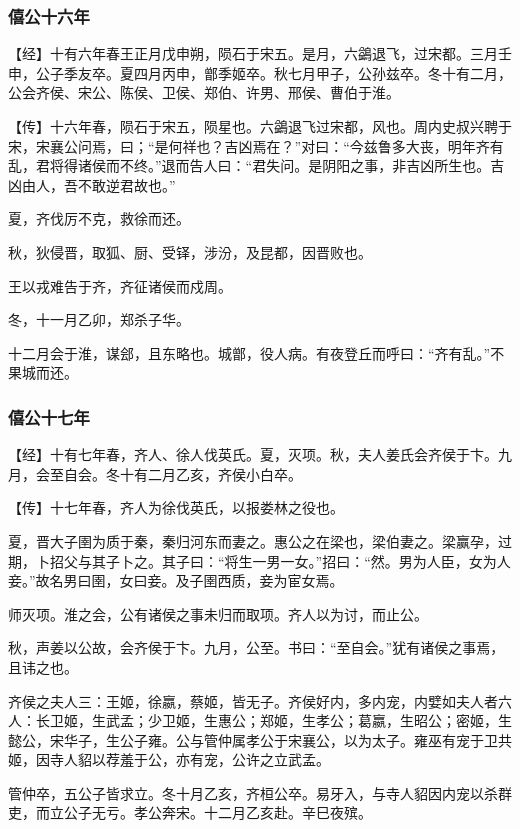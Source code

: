 \documentclass[]{article}
\begin{document}
\hypertarget{header-n818}{%
\subsubsection{僖公十六年}\label{header-n818}}

【经】十有六年春王正月戊申朔，陨石于宋五。是月，六鷁退飞，过宋都。三月壬申，公子季友卒。夏四月丙申，鄫季姬卒。秋七月甲子，公孙兹卒。冬十有二月，公会齐侯、宋公、陈侯、卫侯、郑伯、许男、邢侯、曹伯于淮。

【传】十六年春，陨石于宋五，陨星也。六鷁退飞过宋都，风也。周内史叔兴聘于宋，宋襄公问焉，曰；``是何祥也？吉凶焉在？''对曰：``今兹鲁多大丧，明年齐有乱，君将得诸侯而不终。''退而告人曰：``君失问。是阴阳之事，非吉凶所生也。吉凶由人，吾不敢逆君故也。''

夏，齐伐厉不克，救徐而还。

秋，狄侵晋，取狐、厨、受铎，涉汾，及昆都，因晋败也。

王以戎难告于齐，齐征诸侯而戍周。

冬，十一月乙卯，郑杀子华。

十二月会于淮，谋郐，且东略也。城鄫，役人病。有夜登丘而呼曰：``齐有乱。''不果城而还。

\hypertarget{header-n828}{%
\subsubsection{僖公十七年}\label{header-n828}}

【经】十有七年春，齐人、徐人伐英氏。夏，灭项。秋，夫人姜氏会齐侯于卞。九月，会至自会。冬十有二月乙亥，齐侯小白卒。

【传】十七年春，齐人为徐伐英氏，以报娄林之役也。

夏，晋大子圉为质于秦，秦归河东而妻之。惠公之在梁也，梁伯妻之。梁赢孕，过期，卜招父与其子卜之。其子曰：``将生一男一女。''招曰：``然。男为人臣，女为人妾。''故名男曰圉，女曰妾。及子圉西质，妾为宦女焉。

师灭项。淮之会，公有诸侯之事未归而取项。齐人以为讨，而止公。

秋，声姜以公故，会齐侯于卞。九月，公至。书曰：``至自会。''犹有诸侯之事焉，且讳之也。

齐侯之夫人三：王姬，徐嬴，蔡姬，皆无子。齐侯好内，多内宠，内嬖如夫人者六人：长卫姬，生武孟；少卫姬，生惠公；郑姬，生孝公；葛嬴，生昭公；密姬，生懿公，宋华子，生公子雍。公与管仲属孝公于宋襄公，以为太子。雍巫有宠于卫共姬，因寺人貂以荐羞于公，亦有宠，公许之立武孟。

管仲卒，五公子皆求立。冬十月乙亥，齐桓公卒。易牙入，与寺人貂因内宠以杀群吏，而立公子无亏。孝公奔宋。十二月乙亥赴。辛巳夜殡。
\end{document}
